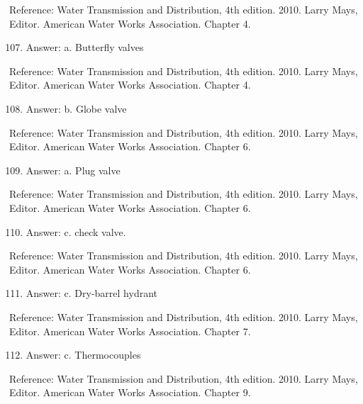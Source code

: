 \documentclass[10pt]{article}
\begin{document}
Reference: Water Transmission and Distribution, 4th edition. 2010. Larry Mays, Editor. American Water Works Association. Chapter 4.

\begin{enumerate}
  \setcounter{enumi}{106}
  \item Answer: a. Butterfly valves
\end{enumerate}

Reference: Water Transmission and Distribution, 4th edition. 2010. Larry Mays, Editor. American Water Works Association. Chapter 4.

\begin{enumerate}
  \setcounter{enumi}{107}
  \item Answer: b. Globe valve
\end{enumerate}

Reference: Water Transmission and Distribution, 4th edition. 2010. Larry Mays, Editor. American Water Works Association. Chapter 6.

\begin{enumerate}
  \setcounter{enumi}{108}
  \item Answer: a. Plug valve
\end{enumerate}

Reference: Water Transmission and Distribution, 4th edition. 2010. Larry Mays, Editor. American Water Works Association. Chapter 6.

\begin{enumerate}
  \setcounter{enumi}{109}
  \item Answer: c. check valve.
\end{enumerate}

Reference: Water Transmission and Distribution, 4th edition. 2010. Larry Mays, Editor. American Water Works Association. Chapter 6.

\begin{enumerate}
  \setcounter{enumi}{110}
  \item Answer: c. Dry-barrel hydrant
\end{enumerate}

Reference: Water Transmission and Distribution, 4th edition. 2010. Larry Mays, Editor. American Water Works Association. Chapter 7.

\begin{enumerate}
  \setcounter{enumi}{111}
  \item Answer: c. Thermocouples
\end{enumerate}

Reference: Water Transmission and Distribution, 4th edition. 2010. Larry Mays, Editor. American Water Works Association. Chapter 9.
\end{document}
